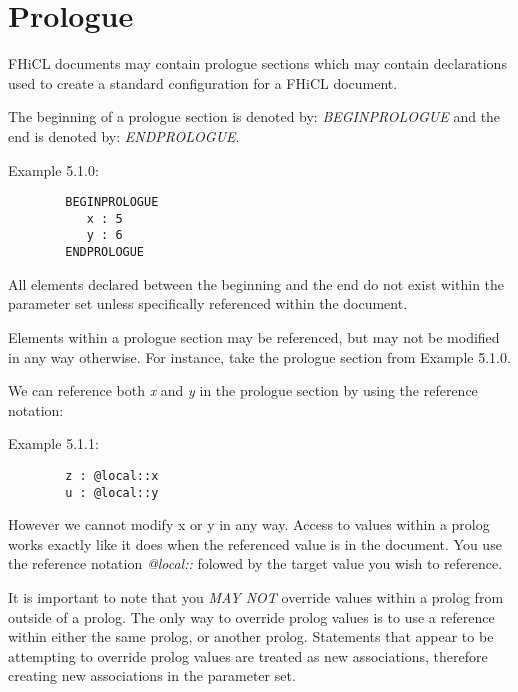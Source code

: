 \documentclass{article}
\begin{document}
\section{Prologue}
	FHiCL documents may contain prologue sections which may contain declarations used to create
	a standard configuration for a FHiCL document.
	\par
	The beginning of a prologue section is denoted by:
	\emph{BEGINPROLOGUE}
	and the end is denoted by:
	\emph{ENDPROLOGUE}.
	\par
	Example 5.1.0:
	\begin{verbatim}
		BEGINPROLOGUE
		   x : 5
		   y : 6
		ENDPROLOGUE
	\end{verbatim}
	All elements declared between the beginning and the end 
	do not exist within the parameter set unless specifically
	referenced within the document.
	\par
	Elements within a prologue section may be referenced,
	but may not be modified in any way otherwise.
	For instance, take the prologue section from Example 5.1.0.
	\par
	We can reference both \emph{x} and \emph{y} in the prologue section by using the reference notation:
	\par
	Example 5.1.1:
	\begin{verbatim}
		z : @local::x
		u : @local::y
	\end{verbatim}
	\par
	However we cannot modify x or y in any way.
        Access to values within a prolog works exactly like it does when the referenced value is in the document.
        You use the reference notation \emph{@local::} folowed by the target value you wish to reference.
        \par
        It is important to note that you \emph{MAY NOT} override values within a prolog from outside of a prolog.
        The only way to override prolog values is to use a reference within either the same prolog, or another prolog.
        Statements that appear to be attempting to override prolog values are treated as new associations, therefore creating
        new associations in the parameter set.
\end{document}
